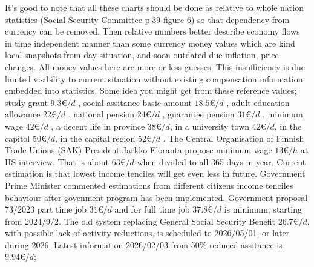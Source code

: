 It's good to note that all these charts should be done as relative to whole
nation statistics (Social Security Committee \cite{VN_2023_26} p.39 figure 6)
so that dependency from currency can be removed. Then relative numbers better
describe economy flows in time independent manner than some currency money
values which are kind local snapshots from day situation, and soon outdated
due inflation, price changes. All money values here are more or less guesses.
This insufficiency is due limited visibility to current situation without
existing compensation information embedded into statistics. Some idea you
might get from these reference values; study grant $9.3\euro/d$ \cite{
 KELA_StudyGrant}, social assitance basic amount $18.5\euro/d$ \cite{
 KELA_BASIC_ASSISTANCE}, adult education allowance $22\euro/d$ \cite{
 AdultEducationAllowance}, national pension $24\euro/d$ \cite{
 KELA_NATIONAL_PENSION}, guarantee pension $31\euro/d$ \cite{
 GUARANTEE_PENSION}, minimum wage $42\euro/d$ \cite{KELA_WORK_REQ}, a decent
life in province $38\euro/d$, in a university town $42\euro/d$, in the
capitol $50\euro/d$, in the capital region $52\euro/d$ \cite{THL_2023_1}. The
Central Organisation of Finnish Trade Unions (SAK) President Jarkko Eloranta
propose minimum wage $13\euro/h$ at HS interview\allowbreak\cite{
 HS_202307290200_RS}. That is about $63\euro/d$ when divided to all 365 days
in year. Current estimation is that lowest income tenciles will get even less
in future. Government Prime Minister commented \cite{CutExplanation}
estimations from different citizens income tenciles behaviour after govenment
program has been implemented. Government proposal 73/2023\allowbreak\cite{
 HE_73/2023_vp} part time job $31\euro/d$ and for full time job $37.8\euro/d$
is minimum, starting from 2024/9/2. The old system replacing General Social
Security Benefit\allowbreak\cite{GSSB} $26.7\euro/d$, with possible lack of
activity reductions, is scheduled to 2026/05/01, or later during 2026. Latest
information 2026/02/03 from 50\% reduced assitance is
$9.94\euro/d$\allowbreak\cite{KELA_50PROS_BASIC_ASSISTANCE};

